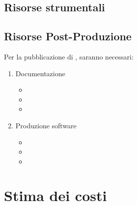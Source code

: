 \subsection{Risorse strumentali}

\subsection{Risorse Post-Produzione}
Per la pubblicazione di \ProjectTitle{}, saranno necessari:
\begin{enumerate}
	\item Documentazione
	\begin{itemize}
		\item 
		\item 
		\item 
	\end{itemize}
	\item Produzione software
	\begin{itemize}
		\item 
		\item 
		\item 
	\end{itemize}
\end{enumerate}

\section{Stima dei costi}

